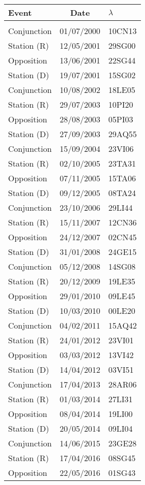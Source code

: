 \newpage
\begin{table}\centering
\begin{tabular}{lcl}
Event & Date & $\lambda$ \\\hline
&&\\[-1.75ex]
Conjunction & 01/07/2000 & 10CN13\\
Station (R) & 12/05/2001 & 29SG00\\
Opposition & 13/06/2001 & 22SG44\\
Station (D) & 19/07/2001 & 15SG02\\
Conjunction & 10/08/2002 & 18LE05\\
Station (R) & 29/07/2003 & 10PI20\\
Opposition & 28/08/2003 & 05PI03\\
Station (D) & 27/09/2003 & 29AQ55\\
Conjunction & 15/09/2004 & 23VI06\\
Station (R) & 02/10/2005 & 23TA31\\
Opposition & 07/11/2005 & 15TA06\\
Station (D) & 09/12/2005 & 08TA24\\
Conjunction & 23/10/2006 & 29LI44\\
Station (R) & 15/11/2007 & 12CN36\\
Opposition & 24/12/2007 & 02CN45\\
Station (D) & 31/01/2008 & 24GE15\\
Conjunction & 05/12/2008 & 14SG08\\
Station (R) & 20/12/2009 & 19LE35\\
Opposition & 29/01/2010 & 09LE45\\
Station (D) & 10/03/2010 & 00LE20\\
Conjunction & 04/02/2011 & 15AQ42\\
Station (R) & 24/01/2012 & 23VI01\\
Opposition & 03/03/2012 & 13VI42\\
Station (D) & 14/04/2012 & 03VI51\\
Conjunction & 17/04/2013 & 28AR06\\
Station (R) & 01/03/2014 & 27LI31\\
Opposition & 08/04/2014 & 19LI00\\
Station (D) & 20/05/2014 & 09LI04\\
Conjunction & 14/06/2015 & 23GE28\\
Station (R) & 17/04/2016 & 08SG45\\
Opposition & 22/05/2016 & 01SG43\\

\end{tabular}
\end{table}

